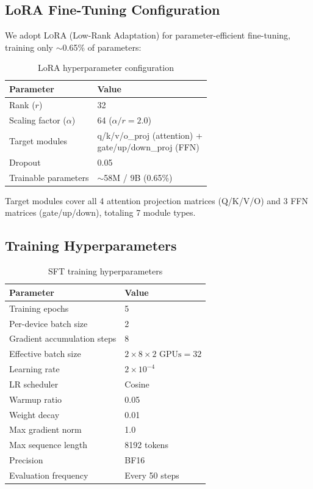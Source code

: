\documentclass[12pt, a4paper]{article}
\newcommand{\lora}{\textsc{LoRA}}
\begin{document}
\subsection{LoRA Fine-Tuning Configuration}

We adopt \lora{} (Low-Rank Adaptation) for parameter-efficient fine-tuning, training only $\sim$0.65\% of parameters:

\begin{table}[H]
\centering
\caption{LoRA hyperparameter configuration}
\label{tab:lora-config}
\small
\begin{tabular}{ll}
\toprule
\textbf{Parameter} & \textbf{Value} \\
\midrule
Rank ($r$)                & 32 \\
Scaling factor ($\alpha$) & 64 ($\alpha/r = 2.0$) \\
Target modules           & \makecell[l]{q/k/v/o\_proj (attention) +\\gate/up/down\_proj (FFN)} \\
Dropout                  & 0.05 \\
Trainable parameters     & $\sim$58M / 9B (0.65\%) \\
\bottomrule
\end{tabular}
\end{table}

\noindent
Target modules cover all 4 attention projection matrices (Q/K/V/O) and 3 FFN matrices (gate/up/down), totaling 7 module types.

\subsection{Training Hyperparameters}

\begin{table}[H]
\centering
\caption{SFT training hyperparameters}
\label{tab:sft-config}
\small
\begin{tabular}{ll}
\toprule
\textbf{Parameter} & \textbf{Value} \\
\midrule
Training epochs                & 5 \\
Per-device batch size          & 2 \\
Gradient accumulation steps    & 8 \\
Effective batch size           & $2 \times 8 \times 2\text{ GPUs} = 32$ \\
Learning rate                  & $2 \times 10^{-4}$ \\
LR scheduler                  & Cosine \\
Warmup ratio                  & 0.05 \\
Weight decay                  & 0.01 \\
Max gradient norm             & 1.0 \\
Max sequence length           & 8192 tokens \\
Precision                     & BF16 \\
Evaluation frequency          & Every 50 steps \\
\bottomrule
\end{tabular}
\end{table}
\end{document}
